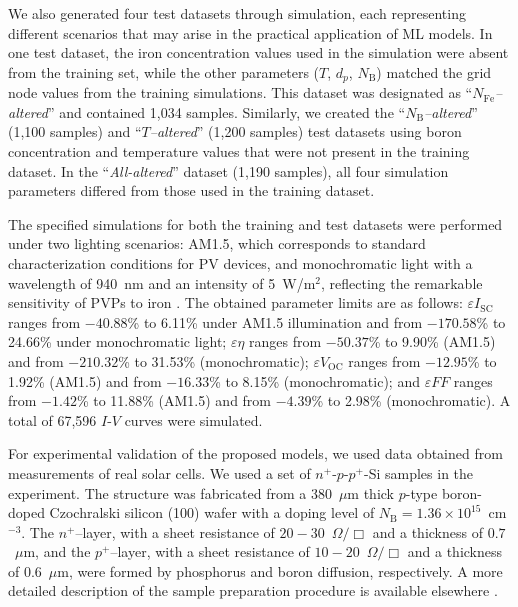 \documentclass[a4paper,fleqn]{cas-sc}
\begin{document}
We also generated four test datasets through simulation,
each representing different scenarios that may arise in the practical application of ML models.
In one test dataset, the iron concentration values used in the simulation were absent from the training set,
while the other parameters ($T$, $d_p$, $N_\mathrm{B}$) matched the grid node values from the training simulations.
This dataset was designated as ``\textit{$N_\mathrm{Fe}$--altered}'' and contained 1,034 samples.
Similarly, we created the ``\textit{$N_\mathrm{B}$--altered}'' (1,100 samples) and ``\textit{$T$--altered}'' (1,200 samples)
test datasets using boron concentration and temperature values that were not present in the training dataset.
In the ``\textit{All-altered}'' dataset (1,190 samples), all four simulation parameters differed from those used in the training dataset.


The specified simulations for both the training and test datasets were performed under two lighting scenarios:
AM1.5, which corresponds to standard characterization conditions for PV devices,
and monochromatic light with a wavelength of 940~nm and an intensity of 5~W/m$^{2}$,
reflecting the remarkable sensitivity of PVPs to iron \cite{Olikh2025MSEB}.
The obtained parameter limits are as follows:
$\varepsilon I_\mathrm{SC}$ ranges from $-40.88$\% to 6.11\% under AM1.5 illumination and
from $-170.58$\% to 24.66\% under monochromatic light;
$\varepsilon \eta$ ranges from $-50.37$\% to 9.90\% (AM1.5)
and from $-210.32$\% to 31.53\% (monochromatic);
$\varepsilon V_\mathrm{OC}$ ranges from $-12.95$\% to 1.92\%  (AM1.5) and
from $-16.33$\% to 8.15\% (monochromatic);
and $\varepsilon F\!F$ ranges from $-1.42$\% to 11.88\% (AM1.5) and
from $-4.39$\% to 2.98\% (monochromatic).
A total of 67,596 $I$-$V$ curves were simulated.

For experimental validation of the proposed models, we used data obtained from measurements of real solar cells.
We used a set of $n^+$-$p$-$p^+$-Si samples in the experiment.
The structure was fabricated from a 380~$\mu$m thick $p$-type boron-doped Czochralski silicon (100) wafer
with a doping level of $N_\mathrm{B}=1.36\times10^{15}$~cm$^{-3}$.
The $n^+$--layer, with a sheet resistance of $20-30$~$\Omega/\Box$ and a thickness of $0.7$~$\mu$m,
and the $p^+$--layer, with a sheet resistance of $10-20$~$\Omega/\Box$ and a thickness of $0.6$~$\mu$m,
were formed by phosphorus and boron diffusion, respectively.
A more detailed description of the sample preparation procedure is available elsewhere \cite{Olikh2021JAP}.
\end{document}
